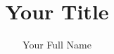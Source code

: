 \documentclass[10pt]{proposal}
\title{Your Title}
\author{Your Full Name}
\begin{document}
	
  \begin{frontmatter}
       \maketitle
       \newpage


        
               \end{frontmatter}
       
              
 \newpage    
\renewcommand*\contentsname{Contents}           
\tableofcontents{}
\newpage    

              



    \pagestyle{fancy}  %

  
  
  
  



\pagebreak    

%
%

\end{document}
